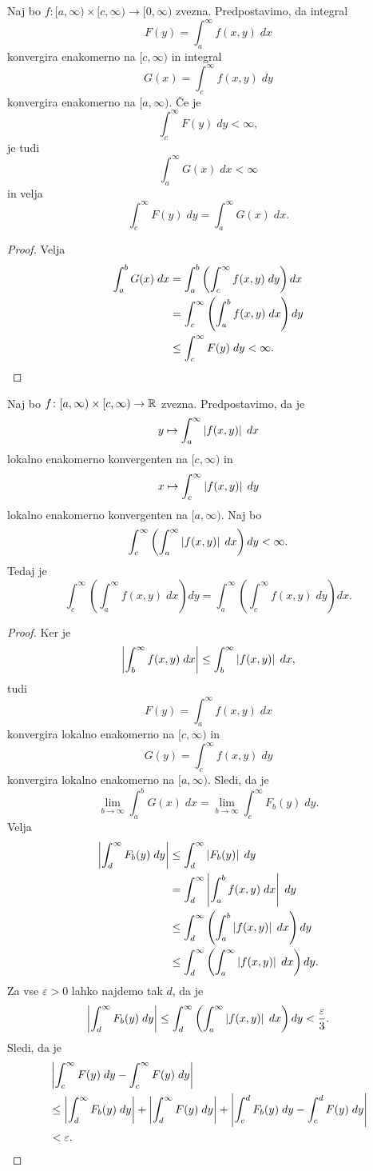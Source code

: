 \begin{izrek}[Fubini]
Naj bo $f \colon [a,\infty) \times [c,\infty) \to [0,\infty)$
zvezna. Predpostavimo, da integral
\[
F(y) = \int_a^\infty f(x,y)\;dx
\]
konvergira enakomerno na $[c,\infty)$ in integral
\[
G(x) = \int_c^\infty f(x,y)\;dy
\]
konvergira enakomerno na $[a,\infty)$. Če je
\[
\int_c^\infty F(y)\;dy < \infty,
\]
je tudi
\[
\int_a^\infty G(x)\;dx < \infty
\]
in velja
\[
\int_c^\infty F(y)\;dy = \int_a^\infty G(x)\;dx.
\]
\end{izrek}

\begin{proof}
Velja
\begin{align*}
\int_a^b G(x)\;dx &=
\int_a^b \left(\int_c^\infty f(x,y)\;dy \right)dx
\\
&=
\int_c^\infty \left(\int_a^b f(x,y)\;dx\right)dy
\\
&\leq
\int_c^\infty F(y)\;dy < \infty. \qedhere
\end{align*}
\end{proof}

\begin{izrek}[Fubini]
Naj bo $f \colon [a,\infty) \times [c,\infty) \to \mathbb{R}$ zvezna.
Predpostavimo, da je
\[
y \mapsto \int_a^\infty \left\lvert f(x,y)\right\rvert\;dx
\]
lokalno enakomerno konvergenten na $[c,\infty)$ in
\[
x \mapsto \int_c^\infty \left\lvert f(x,y)\right\rvert\;dy
\]
lokalno enakomerno konvergenten na $[a,\infty)$. Naj bo
\[
\int_c^\infty \left(\int_a^\infty \left\lvert f(x,y)\right\rvert\;dx\right)dy < \infty.
\]
Tedaj je
\[
\int_c^\infty \left(\int_a^\infty f(x,y)\;dx\right)dy =
\int_a^\infty \left(\int_c^\infty f(x,y)\;dy\right)dx.
\]
\end{izrek}

\begin{proof}
Ker je
\[
\left\lvert \int_b^\infty f(x,y)\;dx\right\rvert \leq \int_b^\infty \left\lvert f(x,y)\right\rvert\;dx,
\]
tudi
\[
F(y) = \int_a^\infty f(x,y)\;dx
\]
konvergira lokalno enakomerno na $[c,\infty)$ in
\[
G(y) = \int_c^\infty f(x,y)\;dy
\]
konvergira lokalno enakomerno na $[a,\infty)$. Sledi, da je
\[
\lim_{b \to \infty}\int_a^b G(x)\;dx =
\lim_{b \to \infty}
\int_c^\infty F_b(y)\;dy.
\]
Velja
\begin{align*}
\left\lvert \int_d^\infty F_b(y)\;dy\right\rvert &\leq
\int_d^\infty \left\lvert F_b(y)\right\rvert\;dy
\\
&=
\int_d^\infty \left\lvert \int_a^b f(x,y)\;dx\right\rvert\;dy
\\
&\leq
\int_d^\infty \left(\int_a^b \left\lvert f(x,y)\right\rvert\;dx\right)dy
\\
&\leq
\int_d^\infty \left(\int_a^\infty \left\lvert f(x,y)\right\rvert\;dx\right)dy.
\end{align*}
Za vse $\varepsilon > 0$ lahko najdemo tak $d$, da je
\[
\left\lvert \int_d^\infty F_b(y)\;dy\right\rvert \leq
\int_d^\infty \left(\int_a^\infty \left\lvert f(x,y)\right\rvert\;dx\right)dy <
\frac{\varepsilon}{3}.
\]
Sledi, da je
\begin{align*}
&\left\lvert \int_c^\infty F(y)\;dy - \int_c^\infty F(y)\;dy\right\rvert
\\
&\leq
\left\lvert \int_d^\infty F_b(y)\;dy\right\rvert +
\left\lvert \int_d^\infty F(y)\;dy\right\rvert +
\left\lvert \int_c^d F_b(y)\;dy - \int_c^d F(y)\;dy\right\rvert
\\
&<
\varepsilon. \qedhere
\end{align*}
\end{proof}

